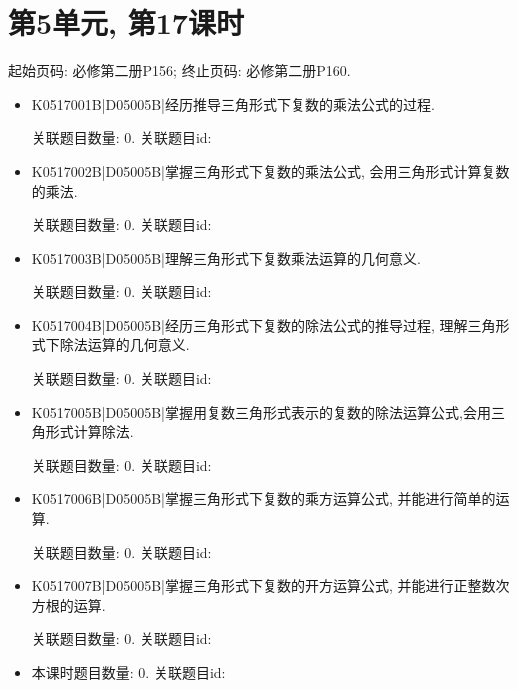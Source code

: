\section*{第5单元, 第17课时}
起始页码: 必修第二册P156; 终止页码: 必修第二册P160.
\begin{itemize}
\item K0517001B|D05005B|经历推导三角形式下复数的乘法公式的过程.

关联题目数量: 0. 关联题目id: 

\item K0517002B|D05005B|掌握三角形式下复数的乘法公式, 会用三角形式计算复数的乘法.

关联题目数量: 0. 关联题目id: 

\item K0517003B|D05005B|理解三角形式下复数乘法运算的几何意义.

关联题目数量: 0. 关联题目id: 

\item K0517004B|D05005B|经历三角形式下复数的除法公式的推导过程, 理解三角形式下除法运算的几何意义.

关联题目数量: 0. 关联题目id: 

\item K0517005B|D05005B|掌握用复数三角形式表示的复数的除法运算公式,会用三角形式计算除法.

关联题目数量: 0. 关联题目id: 

\item K0517006B|D05005B|掌握三角形式下复数的乘方运算公式, 并能进行简单的运算.

关联题目数量: 0. 关联题目id: 

\item K0517007B|D05005B|掌握三角形式下复数的开方运算公式, 并能进行正整数次方根的运算.

关联题目数量: 0. 关联题目id: 

\item 本课时题目数量: 0. 关联题目id: 

\end{itemize}

